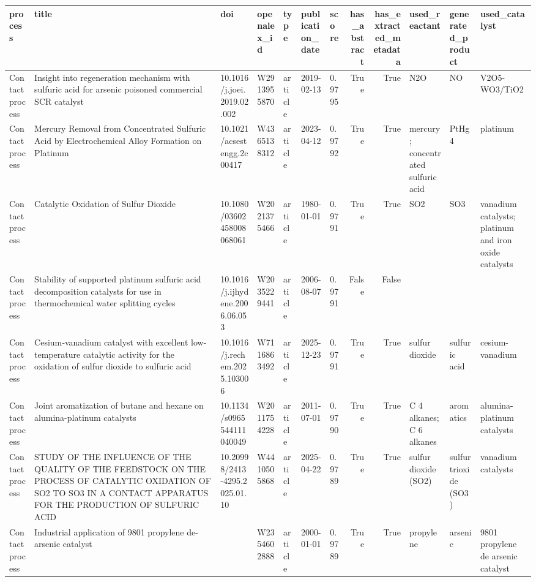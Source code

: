 \begin{tabular}{lllllllrrlll}
\toprule
process & title & doi & openalex\_id & type & publication\_date & score & has\_abstract & has\_extracted\_metadata & used\_reactant & generated\_product & used\_catalyst \\
\midrule
Contact process & Insight into regeneration mechanism with sulfuric acid for arsenic poisoned commercial SCR catalyst & 10.1016/j.joei.2019.02.002 & W2913955870 & article & 2019-02-13 & 0.9795 & True & True & N2O & NO & V2O5-WO3/TiO2 \\
Contact process & Mercury Removal from Concentrated Sulfuric Acid by Electrochemical Alloy Formation on Platinum & 10.1021/acsestengg.2c00417 & W4365138312 & article & 2023-04-12 & 0.9792 & True & True & mercury; concentrated sulfuric acid & PtHg4 & platinum \\
Contact process & Catalytic Oxidation of Sulfur Dioxide & 10.1080/03602458008068061 & W2021375466 & article & 1980-01-01 & 0.9791 & True & True & SO2 & SO3 & vanadium catalysts; platinum and iron oxide catalysts \\
Contact process & Stability of supported platinum sulfuric acid decomposition catalysts for use in thermochemical water splitting cycles & 10.1016/j.ijhydene.2006.06.053 & W2035229441 & article & 2006-08-07 & 0.9791 & False & False &  &  &  \\
Contact process & Cesium‑vanadium catalyst with excellent low-temperature catalytic activity for the oxidation of sulfur dioxide to sulfuric acid & 10.1016/j.rechem.2025.103006 & W7116863492 & article & 2025-12-23 & 0.9791 & True & True & sulfur dioxide & sulfuric acid & cesium-vanadium \\
Contact process & Joint aromatization of butane and hexane on alumina-platinum catalysts & 10.1134/s0965544111040049 & W2011754228 & article & 2011-07-01 & 0.9790 & True & True & C 4 alkanes; C 6 alkanes & aromatics & alumina-platinum catalysts \\
Contact process & STUDY OF THE INFLUENCE OF THE QUALITY OF THE FEEDSTOCK ON THE PROCESS OF CATALYTIC OXIDATION OF SO2 TO SO3 IN A CONTACT APPARATUS FOR THE PRODUCTION OF SULFURIC ACID & 10.20998/2413-4295.2025.01.10 & W4410505868 & article & 2025-04-22 & 0.9789 & True & True & sulfur dioxide (SO2) & sulfur trioxide (SO3) & vanadium catalysts \\
Contact process & Industrial application of 9801 propylene de-arsenic catalyst &  & W2354602888 & article & 2000-01-01 & 0.9789 & True & True & propylene & arsenic & 9801 propylene de arsenic catalyst \\

\end{tabular}
